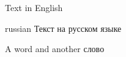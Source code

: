 \documentclass{ximera}
\begin{document}
\setcrambond{2pt}{}{} %

Text in English

\begin{otherlanguage*}{russian}
Текст на русском языке
\end{otherlanguage*}

A word and another \foreignlanguage{russian}{слово}
\end{document}
